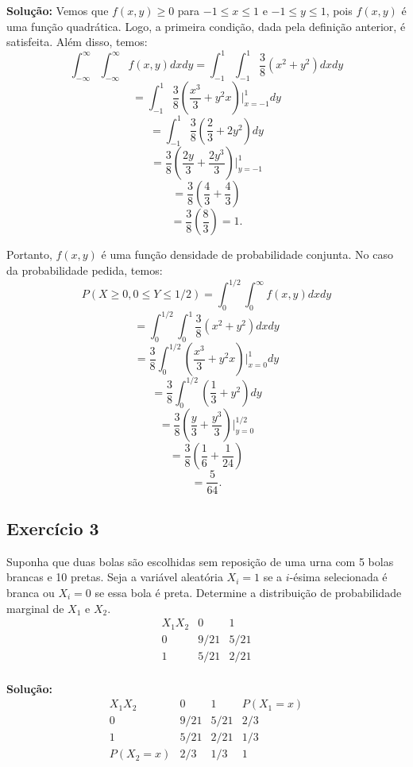 \documentclass{article}
\begin{document}
\vspace{0.5cm}
\textbf{Solução:} Vemos que $f(x,y) \ge 0$ para $-1 \le x \le 1$ e $-1 \le y \le 1$, pois $f(x,y)$ é uma função quadrática. Logo, a primeira condição, dada pela definição anterior, é satisfeita. Além disso, temos:
    $$
    \int_{-\infty}^{\infty} \int_{-\infty}^{\infty} f(x,y) dx dy
    = \int_{-1}^{1} \int_{-1}^{1} \frac{3}{8}(x^2 + y^2) dx dy
    $$
    $$
    = \int_{-1}^{1} \frac{3}{8}\left(\frac{x^3}{3} + y^2 x\right)\bigg|_{x=-1}^{1} dy
    $$
    $$
    = \int_{-1}^{1} \frac{3}{8}\left(\frac{2}{3} + 2y^2\right) dy
    $$
    $$
    = \frac{3}{8}\left(\frac{2y}{3} + \frac{2y^3}{3}\right)\bigg|_{y=-1}^{1}
    $$
    $$
    = \frac{3}{8}\left(\frac{4}{3} + \frac{4}{3}\right)
    $$
    $$
    = \frac{3}{8}\left(\frac{8}{3}\right) = 1.
    $$

Portanto, $f(x,y)$ é uma função densidade de probabilidade conjunta.
No caso da probabilidade pedida, temos:
    $$
    P(X \ge 0, 0 \le Y \le 1/2) = \int_0^{1/2} \int_0^{\infty} f(x,y) dx dy
    $$
    $$
    = \int_0^{1/2} \int_0^{1} \frac{3}{8}(x^2 + y^2) dx dy
    $$
    $$
    = \frac{3}{8} \int_0^{1/2} \left( \frac{x^3}{3} + y^2 x \right) \bigg|_{x=0}^{1} dy
    $$
    $$
    = \frac{3}{8} \int_0^{1/2} \left( \frac{1}{3} + y^2 \right) dy
    $$
    $$
    = \frac{3}{8} \left( \frac{y}{3} + \frac{y^3}{3} \right) \bigg|_{y=0}^{1/2}
    $$
    $$
    = \frac{3}{8} \left( \frac{1}{6} + \frac{1}{24} \right)
    $$
    $$
    = \frac{5}{64}.
    $$
    
\subsection{Exercício 3}
Suponha que duas bolas são escolhidas sem reposição de uma urna com 5 bolas brancas e 10 pretas. Seja a variável aleatória $X_i = 1$ se a $i$-ésima selecionada é branca ou $X_i = 0$ se essa bola é preta. Determine a distribuição de probabilidade marginal de $X_1$ e $X_2$.
    \[
    \begin{array}{c|cc}
    X_1 X_2 & 0 & 1 \\
    \hline
    0 & 9/21 & 5/21 \\
    1 & 5/21 & 2/21 \\
    \end{array}
    \]

\vspace{0.5cm}
\textbf{Solução:}
    \[
    \begin{array}{c|cc|c}
    X_1 X_2 & 0 & 1 & P(X_1 = x) \\
    \hline
    0 & 9/21 & 5/21 & 2/3 \\
    1 & 5/21 & 2/21 & 1/3 \\
    \hline
    P(X_2 = x) & 2/3 & 1/3 & 1 \\
    \end{array}
    \]
\end{document}
